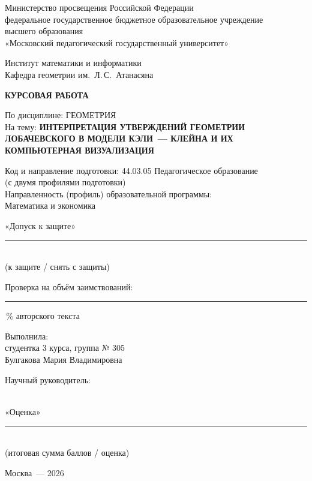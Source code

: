 \begin{titlepage}
\begin{singlespace}
\centering
Министерство просвещения Российской Федерации\\
федеральное государственное бюджетное образовательное учреждение\\
высшего образования\\
«Московский педагогический государственный университет»

\vspace{1.2cm}
Институт математики и информатики\\
Кафедра геометрии им.~Л.\,С.~Атанасяна

\vspace{2cm}
{\bfseries КУРСОВАЯ РАБОТА}

\vspace{0.8cm}
По дисциплине: ГЕОМЕТРИЯ\\[4pt]
На тему: {\bfseries ИНТЕРПРЕТАЦИЯ УТВЕРЖДЕНИЙ ГЕОМЕТРИИ ЛОБАЧЕВСКОГО В МОДЕЛИ КЭЛИ~--- КЛЕЙНА И ИХ КОМПЬЮТЕРНАЯ ВИЗУАЛИЗАЦИЯ}

\vspace{0.8cm}
Код и направление подготовки: 44.03.05 Педагогическое образование\\
(с двумя профилями подготовки)\\
Направленность (профиль) образовательной программы:\\
Математика и экономика

\vspace{1.2cm}
\begin{minipage}[t]{0.45\textwidth}
\raggedright
«Допуск к защите»\\[2pt]
\rule{5cm}{0.4pt}\\
{\small (к защите / снять с защиты)}

\vspace{1cm}
Проверка на объём заимствований:\\
\rule{2cm}{0.4pt}\,\% авторского текста
\end{minipage}\hfill
\begin{minipage}[t]{0.5\textwidth}
\raggedleft
Выполнила:\\
студентка 3 курса, группа № 305\\
Булгакова Мария Владимировна

\vspace{0.6cm}
Научный руководитель:\\
\\

\vspace{0.6cm}
«Оценка» \rule{2.5cm}{0.4pt}\\
{\small (итоговая сумма баллов / оценка)}
\end{minipage}

\vfill
Москва~--- 2026
\end{singlespace}
\end{titlepage}
\setcounter{page}{2}
